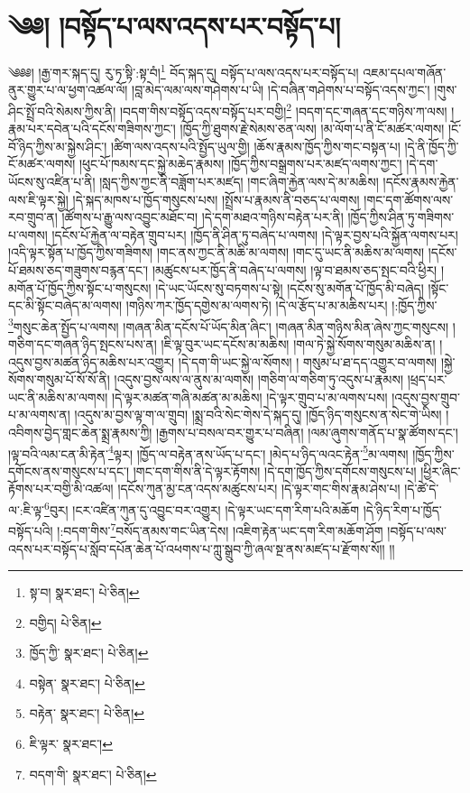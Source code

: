 \setcounter{footnote}{0} 
\chapter{༄༅། །བསྟོད་པ་ལས་འདས་པར་བསྟོད་པ།}༄༅༅། །རྒྱ་གར་སྐད་དུ། རུ་ཏ་སྟི་:སྟ་བཾ།\footnote{སྟ་བ།  སྣར་ཐང་།  པེ་ཅིན། } བོད་སྐད་དུ། བསྟོད་པ་ལས་འདས་པར་བསྟོད་པ། འཇམ་དཔལ་གཞོན་ནུར་གྱུར་པ་ལ་ཕྱག་འཚལ་ལོ། །བླ་མེད་ལམ་ལས་གཤེགས་པ་ཡི། །དེ་བཞིན་གཤེགས་པ་བསྟོད་འདས་ཀྱང་། །གུས་ཤིང་སྤྲོ་བའི་སེམས་ཀྱིས་ནི། །བདག་གིས་བསྟོད་འདས་བསྟོད་པར་བགྱི།\footnote{བགྱིད།  པེ་ཅིན། } །བདག་དང་གཞན་དང་གཉིས་ཀ་ལས། །རྣམ་པར་དབེན་པའི་དངོས་གཟིགས་ཀྱང་། །ཁྱོད་ཀྱི་ཐུགས་རྗེ་སེམས་ཅན་ལས། །མ་ལོག་པ་ནི་ངོ་མཚར་ལགས། །ངོ་བོ་ཉིད་ཀྱིས་མ་སྐྱེས་ཤིང་། །ཚིག་ལས་འདས་པའི་སྤྱོད་ཡུལ་གྱི། །ཆོས་རྣམས་ཁྱོད་ཀྱིས་གང་བསྟན་པ། །དེ་ནི་ཁྱོད་ཀྱི་ངོ་མཚར་ལགས། །ཕུང་པོ་ཁམས་དང་སྐྱེ་མཆེད་རྣམས། །ཁྱོད་ཀྱིས་བསྒྲགས་པར་མཛད་ལགས་ཀྱང་། །དེ་དག་ཡོངས་སུ་འཛིན་པ་ནི། །སླད་ཀྱིས་ཀྱང་ནི་བཟློག་པར་མཛད། །གང་ཞིག་རྐྱེན་ལས་དེ་མ་མཆིས། །དངོས་རྣམས་རྐྱེན་ལས་ཇི་ལྟར་སྐྱེ། །དེ་སྐད་མཁས་པ་ཁྱོད་གསུངས་པས། །སྤྲོས་པ་རྣམས་ནི་བཅད་པ་ལགས། །གང་དག་ཚོགས་ལས་རབ་གྲུབ་ན། །ཚོགས་པ་རྒྱུ་ལས་འབྱུང་མཐོང་བ། །དེ་དག་མཐའ་གཉིས་བརྟེན་པར་ནི། །ཁྱོད་ཀྱིས་ཤིན་ཏུ་གཟིགས་པ་ལགས། །དངོས་པོ་རྐྱེན་ལ་བརྟེན་གྲུབ་པར། །ཁྱོད་ནི་ཤིན་ཏུ་བཞེད་པ་ལགས། །དེ་ལྟར་བྱས་པའི་སྐྱོན་ལགས་པར། །འདི་ལྟར་སྟོན་པ་ཁྱོད་ཀྱིས་གཟིགས། །གང་ནས་ཀྱང་ནི་མཆི་མ་ལགས། །གང་དུ་ཡང་ནི་མཆིས་མ་ལགས། །དངོས་པོ་ཐམས་ཅད་གཟུགས་བརྙན་དང་། །མཚུངས་པར་ཁྱོད་ནི་བཞེད་པ་ལགས། །ལྟ་བ་ཐམས་ཅད་སྤང་བའི་ཕྱིར། །མགོན་པོ་ཁྱོད་ཀྱིས་སྟོང་པ་གསུངས། །དེ་ཡང་ཡོངས་སུ་བཏགས་པ་སྟེ། །དངོས་སུ་མགོན་པོ་ཁྱོད་མི་བཞེད། །སྟོང་དང་མི་སྟོང་བཞེད་མ་ལགས། །གཉིས་ཀར་ཁྱོད་དགྱེས་མ་ལགས་ཏེ། །དེ་ལ་རྩོད་པ་མ་མཆིས་པར། །:ཁྱོད་ཀྱིས་\footnote{ཁྱོད་ཀྱི་  སྣར་ཐང་།  པེ་ཅིན། }གསུང་ཆེན་སྤྱོད་པ་ལགས། །གཞན་མིན་དངོས་པོ་ཡོད་མིན་ཞིང་། །གཞན་མིན་གཉིས་མིན་ཞེས་ཀྱང་གསུངས། །གཅིག་དང་གཞན་ཉིད་སྤངས་པས་ན། །ཇི་ལྟ་བུར་ཡང་དངོས་མ་མཆིས། །གལ་ཏེ་སྐྱེ་སོགས་གསུམ་མཆིས་ན། །འདུས་བྱས་མཚན་ཉིད་མཆིས་པར་འགྱུར། །དེ་དག་གི་ཡང་སྐྱེ་ལ་སོགས། །
གསུམ་པ་ཐ་དད་འགྱུར་བ་ལགས། །སྐྱེ་སོགས་གསུམ་པོ་སོ་སོ་ནི། །འདུས་བྱས་ལས་ལ་ནུས་མ་ལགས། །གཅིག་ལ་གཅིག་ཏུ་འདུས་པ་རྣམས། །ཕྲད་པར་ཡང་ནི་མཆིས་མ་ལགས། །དེ་ལྟར་མཚན་གཞི་མཚན་མ་མཆིས། །དེ་ལྟར་གྲུབ་པ་མ་ལགས་པས། །འདུས་བྱས་གྲུབ་པ་མ་ལགས་ན། །འདུས་མ་བྱས་ལྟ་ག་ལ་གྲུབ། །སྨྲ་བའི་སེང་གེས་དེ་སྐད་དུ། །ཁྱོད་ཉིད་གསུངས་ན་སེང་གེ་ཡིས། །འབིགས་བྱེད་གླང་ཆེན་སྨྲ་རྣམས་ཀྱི། །རྒྱགས་པ་བསལ་བར་གྱུར་པ་བཞིན། །ལམ་ཞུགས་གནོད་པ་སྣ་ཚོགས་དང་། །ལྟ་བའི་ལམ་ངན་མི་རྟེན་\footnote{བསྟེན་  སྣར་ཐང་།  པེ་ཅིན། }ལྟར། །ཁྱོད་ལ་བརྟེན་ནས་ཡོད་པ་དང་། །མེད་པ་ཉིད་ལའང་རྟེན་\footnote{བརྟེན་  སྣར་ཐང་།  པེ་ཅིན། }མ་ལགས། །ཁྱོད་ཀྱིས་དགོངས་ནས་གསུངས་པ་དང་། །གང་དག་གིས་ནི་དེ་ལྟར་རྟོགས། །དེ་དག་ཁྱོད་ཀྱིས་དགོངས་གསུངས་པ། །ཕྱིར་ཞིང་རྟོགས་པར་བགྱི་མི་འཚལ། །དངོས་ཀུན་མྱ་ངན་འདས་མཚུངས་པར། །དེ་ལྟར་གང་གིས་རྣམ་ཤེས་པ། །དེ་ཚེ་དེ་ལ་:ཇི་ལྟ་\footnote{ཇི་ལྟར་  སྣར་ཐང་། }བུར། །ངར་འཛིན་ཀུན་དུ་འབྱུང་བར་འགྱུར། །དེ་ལྟར་ཡང་དག་རིག་པའི་མཆོག །དེ་ཉིད་རིག་པ་ཁྱོད་བསྟོད་པའི། །:བདག་གིས་\footnote{བདག་གི་  སྣར་ཐང་།  པེ་ཅིན། }བསོད་ནམས་གང་ཡིན་དེས། །འཇིག་རྟེན་ཡང་དག་རིག་མཆོག་ཤོག །བསྟོད་པ་ལས་འདས་པར་བསྟོད་པ་སློབ་དཔོན་ཆེན་པོ་འཕགས་པ་ཀླུ་སྒྲུབ་ཀྱི་ཞལ་སྔ་ནས་མཛད་པ་རྫོགས་སོ།། །།